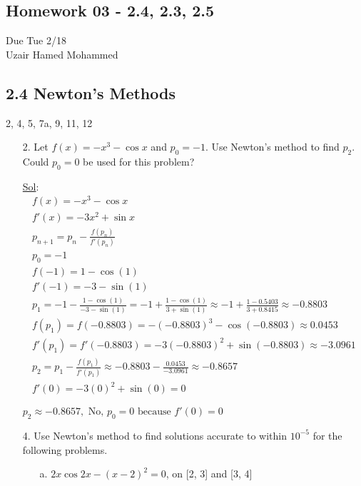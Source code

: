 \begin{center}
  \section*{Homework 03 - 2.4, 2.3, 2.5}
  Due Tue 2/18 \\
  Uzair Hamed Mohammed
\end{center}

\subsection*{2.4 Newton's Methods}

2, 4, 5, 7a, 9, 11, 12

\begin{enumerate}
  \item[2.] Let \( f(x) = -x^3 - \cos x \) and \( p_0 = -1 \). Use
    Newton's method to find \( p_2 \). Could \( p_0 = 0 \) be used
    for this problem?

    \underline{Sol}:\\
    \[
      \begin{array}{l}
        f(x) = -x^3 - \cos x \\
        f'(x) = -3x^2 + \sin x \\
        p_{n+1} = p_n - \frac{f(p_n)}{f'(p_n)} \\
        p_0 = -1 \\
        f(-1) = 1 - \cos(1) \\
        f'(-1) = -3 - \sin(1) \\
        p_1 = -1 - \frac{1 - \cos(1)}{-3 - \sin(1)} = -1 + \frac{1 -
        \cos(1)}{3 + \sin(1)} \approx -1 + \frac{1 - 0.5403}{3 +
        0.8415} \approx -0.8803 \\
        f(p_1) = f(-0.8803) = -(-0.8803)^3 - \cos(-0.8803) \approx 0.0453 \\
        f'(p_1) = f'(-0.8803) = -3(-0.8803)^2 + \sin(-0.8803) \approx -3.0961 \\
        p_2 = p_1 - \frac{f(p_1)}{f'(p_1)} \approx -0.8803 -
        \frac{0.0453}{-3.0961} \approx -0.8657 \\
        f'(0) = -3(0)^2 + \sin(0) = 0
      \end{array}
    \]

    $\boxed{p_2 \approx -0.8657, \text{ No, } p_0 = 0 \text{ because
    } f'(0) = 0}$

  \item[4.] Use Newton's method to find solutions accurate to within
    \( 10^{-5} \) for the following problems.
    \begin{enumerate}
      \item[a.] \( 2x \cos 2x - (x - 2)^2 = 0 \), on [2, 3] and [3, 4]


\end{enumerate}
\end{enumerate}
